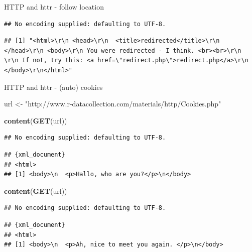 \documentclass[ignorenonframetext,]{beamer}
\newenvironment{Shaded}{\begin{snugshade}}{\end{snugshade}}
\newcommand{\KeywordTok}[1]{\textcolor[rgb]{0.13,0.29,0.53}{\textbf{{#1}}}}
\newcommand{\DataTypeTok}[1]{\textcolor[rgb]{0.13,0.29,0.53}{{#1}}}
\newcommand{\StringTok}[1]{\textcolor[rgb]{0.31,0.60,0.02}{{#1}}}
\newcommand{\NormalTok}[1]{{#1}}
\begin{document}
\begin{frame}[fragile]{HTTP and httr - follow location}

\begin{Shaded}
\end{Shaded}

\begin{verbatim}
## No encoding supplied: defaulting to UTF-8.
\end{verbatim}

\begin{verbatim}
## [1] "<html>\r\n <head>\r\n  <title>redirected</title>\r\n </head>\r\n <body>\r\n You were redirected - I think. <br><br>\r\n \r\n If not, try this: <a href=\"redirect.php\">redirect.php</a>\r\n </body>\r\n</html>"
\end{verbatim}

\end{frame}

\begin{frame}[fragile]{HTTP and httr - (auto) cookies}

\begin{Shaded}
\begin{Highlighting}[]
\NormalTok{url <-}\StringTok{ "http://www.r-datacollection.com/materials/http/Cookies.php"}

\KeywordTok{content}\NormalTok{(}\KeywordTok{GET}\NormalTok{(url))}
\end{Highlighting}
\end{Shaded}

\begin{verbatim}
## No encoding supplied: defaulting to UTF-8.
\end{verbatim}

\begin{verbatim}
## {xml_document}
## <html>
## [1] <body>\n  <p>Hallo, who are you?</p>\n</body>
\end{verbatim}

\begin{Shaded}
\begin{Highlighting}[]
\KeywordTok{content}\NormalTok{(}\KeywordTok{GET}\NormalTok{(url))}
\end{Highlighting}
\end{Shaded}

\begin{verbatim}
## No encoding supplied: defaulting to UTF-8.
\end{verbatim}

\begin{verbatim}
## {xml_document}
## <html>
## [1] <body>\n  <p>Ah, nice to meet you again. </p>\n</body>
\end{verbatim}

\end{frame}
\end{document}
